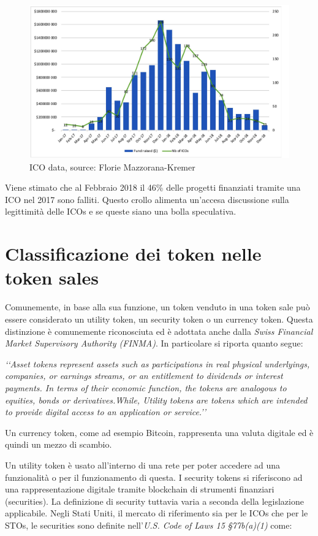 \begin{figure}[H]
  \includegraphics[width=\linewidth]{ico.jpg}
  \caption{ICO data, source: Florie Mazzorana-Kremer\cite{K30}}
  \label{fig:ico}
\end{figure}

Viene stimato che al Febbraio 2018 il 46\% delle progetti finanziati tramite una ICO nel 2017 sono falliti. Questo crollo alimenta un'accesa discussione sulla legittimità delle ICOs e se queste siano una bolla speculativa. 

\section{Classificazione dei token nelle token sales}
Comunemente, in base alla sua funzione, un token venduto in una token sale può essere considerato un utility token, un security token o un currency token. Questa distinzione è comunemente riconosciuta ed è adottata anche dalla \textit{Swiss Financial Market Supervisory Authority (FINMA)}. In particolare si riporta quanto segue:

\textit{‘‘Asset tokens represent assets such as participations in real physical underlyings, companies, or earnings streams, or an entitlement to dividends or interest payments. In terms of their economic function, the tokens are analogous to equities, bonds or derivatives.While, Utility tokens are tokens which are intended to provide digital access to an application or service.’’}


Un currency token, come ad esempio Bitcoin, rappresenta una valuta digitale ed è quindi un mezzo di scambio.

Un utility token è usato all'interno di una rete per poter accedere ad una funzionalità o per il funzionamento di questa. 
I security tokens si riferiscono ad una rappresentazione digitale tramite blockchain di strumenti finanziari (securities). La definizione di security tuttavia varia a seconda della legislazione applicabile.
Negli Stati Uniti, il mercato di riferimento sia per le ICOs che per le STOs, le securities sono definite nell'\textit{U.S. Code of Laws 15 §77b(a)(1)} come:

